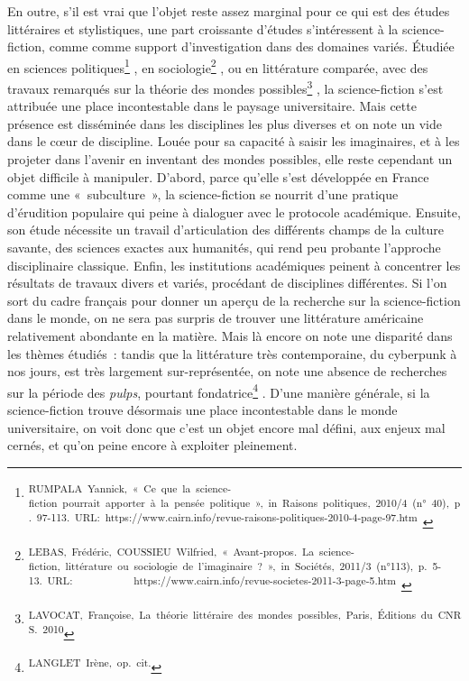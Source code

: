 \documentclass[letterpaper,portrait,12pt]{article}
\begin{document}
En outre, s'il est vrai que l'objet reste assez marginal pour ce qui est des \'{e}tudes litt\'{e}raires et stylistiques, une part croissante d'\'{e}tudes s'int\'{e}ressent \`{a} la science-fiction, comme comme support d'investigation dans des domaines vari\'{e}s. \'{E}tudi\'{e}e en sciences politiques\footnote{\textsuperscript{\newpage
}\textsuperscript{	RUMPALA\ Yannick,\ «\ Ce\ que\ la\ science-fiction\ pourrait\ apporter\ \`{a}\ la\ pens\'{e}e\ politique\ »,\ in\ Raisons\ politiques,\ 2010/4\ (n°\ 40),\ p.\ 97-113.\ URL:\ https://www.cairn.info/revue-raisons-politiques-2010-4-page-97.htm\ }} , en sociologie\footnote{\textsuperscript{\newpage
}\textsuperscript{	LEBAS,\ Fr\'{e}d\'{e}ric,\ COUSSIEU\ Wilfried,\ «\ Avant-propos.\ La\ science-fiction,\ litt\'{e}rature\ ou\ sociologie\ de\ l'imaginaire\ ?\ »,\ in\ Soci\'{e}t\'{e}s,\ 2011/3\ (n°113),\ p.\ 5-13.\ URL:					\ \ \ \ \ \ \ \ \ \ \ https://www.cairn.info/revue-societes-2011-3-page-5.htm\ }} , ou en litt\'{e}rature compar\'{e}e, avec des travaux remarqu\'{e}s sur la th\'{e}orie des mondes possibles\footnote{\textsuperscript{\newpage
}\textsuperscript{	LAVOCAT,\ Fran\c{c}oise,\ La\ th\'{e}orie\ litt\'{e}raire\ des\ mondes\ possibles,\ Paris,\ \'{E}ditions\ du\ CNRS.\ 2010}} , la science-fiction s'est attribu\'{e}e une place incontestable dans le paysage universitaire. Mais cette pr\'{e}sence est diss\'{e}min\'{e}e dans les disciplines les plus diverses et on note un vide dans le c\oe{}ur de discipline. Lou\'{e}e pour sa capacit\'{e} \`{a} saisir les imaginaires, et \`{a} les projeter dans l'avenir en inventant des mondes possibles, elle reste cependant un objet difficile \`{a} manipuler. D'abord, parce qu'elle s'est d\'{e}velopp\'{e}e en France comme une « subculture », la science-fiction se nourrit d'une pratique d'\'{e}rudition populaire qui peine \`{a} dialoguer avec le protocole acad\'{e}mique. Ensuite, son \'{e}tude n\'{e}cessite un travail d'articulation des diff\'{e}rents champs de la culture savante, des sciences exactes aux humanit\'{e}s, qui rend peu probante l'approche disciplinaire classique. Enfin, les institutions acad\'{e}miques peinent \`{a} concentrer les r\'{e}sultats de travaux divers et vari\'{e}s, proc\'{e}dant de disciplines diff\'{e}rentes. Si l'on sort du cadre fran\c{c}ais pour donner un aper\c{c}u de la recherche sur la science-fiction dans le monde, on ne sera pas surpris de trouver une litt\'{e}rature am\'{e}ricaine relativement abondante en la mati\`{e}re. Mais l\`{a} encore on note une disparit\'{e} dans les th\`{e}mes \'{e}tudi\'{e}s : tandis que la litt\'{e}rature tr\`{e}s contemporaine, du cyberpunk \`{a} nos jours, est tr\`{e}s largement sur-repr\'{e}sent\'{e}e, on note une absence de recherches sur la p\'{e}riode des \emph{pulps}, pourtant fondatrice\footnote{\textsuperscript{\newpage
}\textsuperscript{	LANGLET\ Ir\`{e}ne,\ op.\ cit.}} . D'une mani\`{e}re g\'{e}n\'{e}rale, si la science-fiction trouve d\'{e}sormais une place incontestable dans le monde universitaire, on voit donc que c'est un objet encore mal d\'{e}fini, aux enjeux mal cern\'{e}s, et qu'on peine encore \`{a} exploiter pleinement. 
\end{document}
